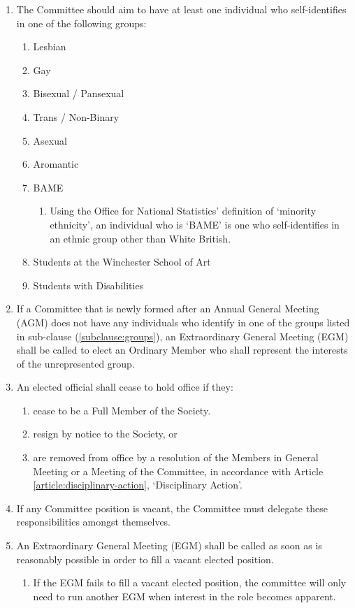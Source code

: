 \documentclass[12pt]{constitution}
\begin{document}
\begin{enumerate}
    \item \label{subclause:groups} The Committee should aim to have at least one individual who self-identifies in one of the following groups: 
    \begin{enumerate}
        \item Lesbian
        \item Gay
        \item Bisexual / Pansexual
        \item Trans / Non-Binary
        \item Asexual
        \item Aromantic
        \item BAME
        \begin{enumerate}
            \item Using the Office for National Statistics' definition of `minority ethnicity', an individual who is `BAME' is one who self-identifies in an ethnic group other than White British.
        \end{enumerate}
        \item Students at the Winchester School of Art
        \item Students with Disabilities
    \end{enumerate}
    
    \item \label{subclause:groups-elect} If a Committee that is newly formed after an Annual General Meeting (AGM) does not have any individuals who identify in one of the groups listed in sub-clause (\ref{subclause:groups}), an Extraordinary General Meeting (EGM) shall be called to elect an Ordinary Member who shall represent the interests of the unrepresented group. 
    
    \item An elected official shall cease to hold office if they:
    \begin{enumerate}
        \item cease to be a Full Member of the Society.
        \item resign by notice to the Society, or
        \item are removed from office by a resolution of the Members in General Meeting or a Meeting of the Committee, in accordance with Article \ref{article:disciplinary-action}, `Disciplinary Action'.
    \end{enumerate}
    
    \item If any Committee position is vacant, the Committee must delegate these responsibilities amongst themselves.
    
    \item An Extraordinary General Meeting (EGM) shall be called as soon as is reasonably possible in order to fill a vacant elected position.
    \begin{enumerate}
        \item If the EGM fails to fill a vacant elected position, the committee will only need to run another EGM when interest in the role becomes apparent.
    \end{enumerate}
\end{enumerate}
\end{document}
